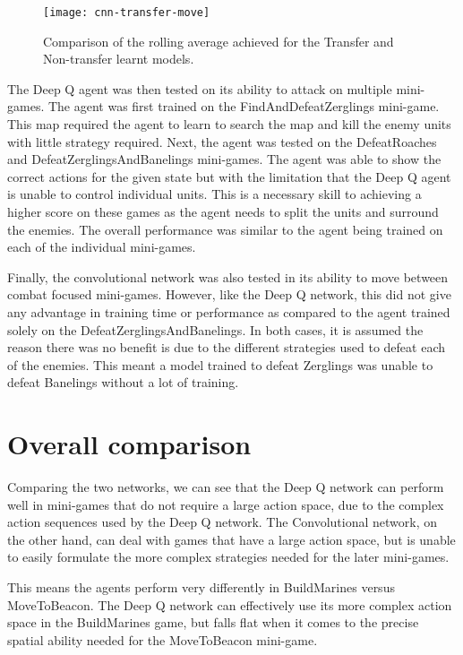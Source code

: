 \begin{figure}[h]
    \centering
    \texttt{[image: cnn-transfer-move]}
    \caption{Comparison of the rolling average achieved for the Transfer and
    Non-transfer learnt models.}%
    \label{fig:transfer_cnn_move}%
\end{figure}

The Deep Q agent was then tested on its ability to attack on multiple mini-games.
The agent was first trained on the FindAndDefeatZerglings mini-game. This map required
the agent to learn to search the map and kill the enemy units with little
strategy required. Next, the agent was tested on the DefeatRoaches and
DefeatZerglingsAndBanelings mini-games. The agent was able to show the correct
actions for the given state but with the limitation that the Deep Q agent is
unable to control individual units. This is a necessary skill to achieving a
higher score on these games as the agent needs to split the units and surround
the enemies. The overall performance was similar to the agent being trained on
each of the individual mini-games.

Finally, the convolutional network was also tested in its ability to move
between combat focused mini-games. However, like the Deep Q network, this did
not give any advantage in training time or performance as compared to the agent
trained solely on the DefeatZerglingsAndBanelings. In both cases, it is assumed
the reason there was no benefit is due to the different strategies used to
defeat each of the enemies. This meant a model trained to defeat Zerglings was
unable to defeat Banelings without a lot of training.

\section{Overall comparison}

Comparing the two networks, we can see that the Deep Q network can perform
well in mini-games that do not require a large action space, due to the complex
action sequences used by the Deep Q network. The Convolutional network, on the
other hand, can deal with games that have a large action space, but is
unable to easily formulate the more complex strategies needed for the later
mini-games.

This means the agents perform very differently in BuildMarines versus MoveToBeacon.
The Deep Q network can effectively use its more complex action space in
the BuildMarines game, but falls flat when it comes to the precise spatial
ability needed for the MoveToBeacon mini-game.


